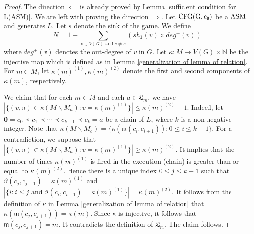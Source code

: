 \documentclass{article}
\theoremstyle{definition}
\newcommand\shotvector[2]{sh_{#1}(#2)}
\newcommand\set[1]{\{ #1 \}}
\begin{document}
\begin{proof}
The direction $\Leftarrow$ is already proved by Lemma \ref{sufficient condition for L(ASM)}. We are left with proving the direction $\Rightarrow$. Let ${\rm CFG(G,c_0)}$ be a ${\rm ASM}$ and generates $L$. Let $s$ denote the sink of the game. We define $$N=1+\underset{v \in V(G)\text{ and } v\neq s}{\sum}(\shotvector{\textbf{1}}{v}\times deg^{+}(v))$$
\noindent where $deg^{+}(v)$ denotes the out-degree of $v$ in $G$. Let $\kappa:M\to V(G)\times \mathbb{N}$ be the injective map which is defined as in Lemma \ref{generalization of lemma of relation}. For $m \in M$, let $\kappa(m)^{(1)},\kappa(m)^{(2)}$ denote the first and second components of $\kappa(m)$, respectively. 

We claim that for each $m \in M$ and each $a \in \mathfrak{L}_m$, we have $|\set{(v,n) \in \kappa(M\backslash M_a): v=\kappa(m)^{(1)}} |\leq \kappa(m)^{(2)}-1$. Indeed, let $\textbf{0}=c_0\prec c_1\prec\cdots \prec c_{k-1}\prec c_k=a$ be a chain of $L$, where $k$ is a non-negative integer. Note that $\kappa(M\backslash M_a)=\set{\kappa(\mathfrak{m}(c_i,c_{i+1})):0 \leq i \leq k-1}$. For a contradiction, we suppose that $|\set{(v,n)\in \kappa(M\backslash M_a): v=\kappa(m)^{(1)}}|\geq \kappa(m)^{(2)}$. It implies that the number of times $\kappa(m)^{(1)}$ is fired in the execution (chain) is greater than or equal to $\kappa(m)^{(2)}$. Hence there is a unique index $0\leq j \leq k-1$ such that $\vartheta(c_j,c_{j+1})=\kappa(m)^{(1)}$ and $|\set{i:i \leq j \text{ and }\vartheta(c_i,c_{i+1})=\kappa(m)^{(1)} }|=\kappa(m)^{(2)}$. It follows from the definition of $\kappa$ in Lemma \ref{generalization of lemma of relation} that $\kappa(\mathfrak{m}(c_j,c_{j+1}))=\kappa(m)$. Since $\kappa$ is injective, it follows that $\mathfrak{m}(c_j,c_{j+1})=m$. It contradicts the definition of $\mathfrak{L}_m$. The claim follows. 


\end{proof}
\end{document}
